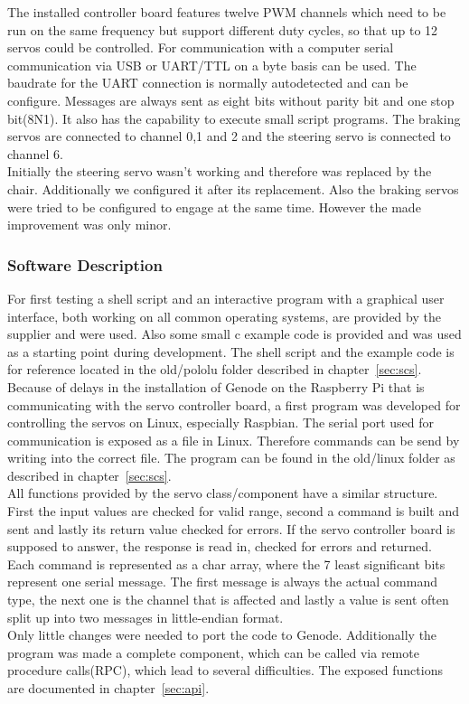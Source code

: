 The installed controller board features twelve PWM channels which need to be run on the same frequency but support different duty cycles, so that up to 12 servos could be controlled. For communication with a computer serial communication via USB or UART/TTL on a byte basis can be used. The baudrate for the UART connection is normally autodetected and can be configure. Messages are always sent as eight bits without parity bit and one stop bit(8N1). It also has the capability to execute small script programs. The braking servos are connected to channel 0,1 and 2 and the steering servo is connected to channel 6.\\

Initially the steering servo wasn't working and therefore was replaced by the chair. Additionally we configured it after its replacement. Also the braking servos were tried to be configured to engage at the same time. However the made improvement was only minor.

\subsubsection{Software Description}
For first testing a shell script and an interactive program with a graphical user interface, both working on all common operating systems, are provided by the supplier and were used. Also some small c example code is provided and was used as a starting point during development. The shell script and the example code is for reference located in the old/pololu folder described in chapter~\ref{sec:scs}.\\

Because of delays in the installation of Genode on the Raspberry Pi that is communicating with the servo controller board, a first program was developed for controlling the servos on Linux, especially Raspbian. The serial port used for communication is exposed as a file in Linux. Therefore commands can be send by writing into the correct file. The program can be found in the old/linux folder as described in chapter~\ref{sec:scs}.\\

All functions provided by the servo class/component have a similar structure. First the input values are checked for valid range, second a command is built and sent and lastly its return value checked for errors. If the servo controller board is supposed to answer, the response is read in, checked for errors and returned. Each command is represented as a char array, where the 7 least significant bits represent one serial message. The first message is always the actual command type, the next one is the channel that is affected and lastly a value is sent often split up into two messages in little-endian format.\\

Only little changes were needed to port the code to Genode. Additionally the program was made a complete component, which can be called via remote procedure calls(RPC), which lead to several difficulties. The exposed functions are documented in chapter~\ref{sec:api}.